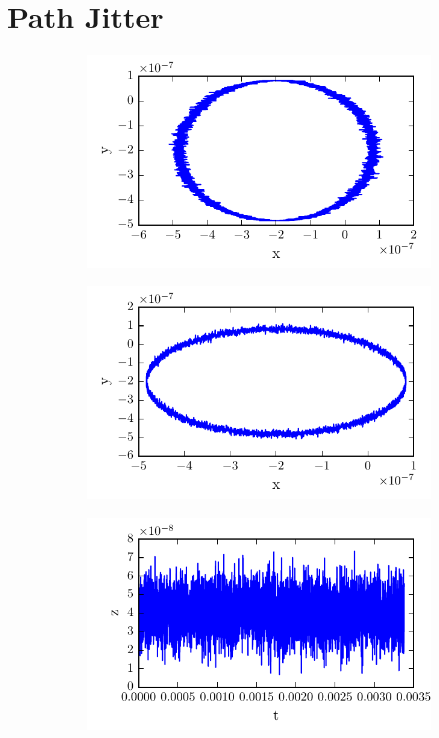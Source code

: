 \section{Path Jitter}

\begin{figure}[H]
	\centering
	\begin{subfigure}[t]{0.49\textwidth}
		\centering
		\includegraphics[width=\linewidth]{Figures/xjit.pdf}
		\caption{}
		\label{fig:xjit}
	\end{subfigure}
	\begin{subfigure}[t]{0.49\textwidth}
		\centering
		\includegraphics[width=\linewidth]{Figures/yjit.pdf}
		\caption{}
		\label{fig:yjit}
	\end{subfigure}
	\begin{subfigure}[t]{0.49\textwidth}
		\centering
		\includegraphics[width=\linewidth]{Figures/zjit.pdf}

\end{subfigure}
\end{figure}
